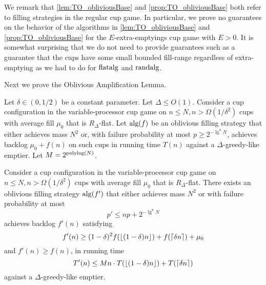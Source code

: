We remark that \cref{lem:TO_obliviousBase} and
\cref{prop:TO_obliviousBase} both refer to filling strategies in
the regular cup game. In particular, we prove no guarantees on
the behavior of the algorithms in \cref{lem:TO_obliviousBase} and
\cref{prop:TO_obliviousBase} for the $E$-extra-emptyings cup game
with $E > 0$. It is somewhat surprising that we do not need to
provide guarantees such as a guarantee that the cups have some
small bounded fill-range regardless of extra-emptying as we had
to do for $\operatorname{\text{\textup{flatalg}}}$ and $\operatorname{\text{\textup{randalg}}}$.

Next we prove the Oblivious Amplification Lemma.
\begin{lemma}
  \label{lem:TO_obliviousAmplification} 
  Let $\delta \in (0, 1/2)$ be a constant parameter. Let $\Delta
  \le O(1)$. Consider a cup configuration
  in the variable-processor cup game on $n \le N, n >
  \Omega(1/\delta^2)$ cups with average fill $\mu_0$ that is
  $R_\Delta$-flat. Let $\operatorname{\text{\textup{alg}}}(f)$ be an oblivious filling strategy
  that either achieves mass $N^2$ or, with failure probability at
  most $p\ge 2^{-\lg^8 N}$, achieves backlog $\mu_0 + f(n)$ on such cups
  in running time $T(n)$ against a $\Delta$-greedy-like emptier.
  Let $M = 2^{\operatorname{\text{polylog}}(N)}$.

  Consider a cup configuration in the variable-processor cup game
  on $n \le N, n > \Omega(1/\delta^2)$ cups with average fill
  $\mu_0$ that is $R_\Delta$-flat. There exists an oblivious
  filling strategy $\operatorname{\text{\textup{alg}}}(f')$ that either achieves mass $N^2$ or
  with failure probability at most 
  $$p' \le np + 2^{-\lg^8 N}$$
  achieves backlog $f'(n)$ satisfying 
  $$f'(n) \ge (1-\delta)^2 f(\left\lfloor (1-\delta)n \right\rfloor) + f(\left\lceil \delta n \right\rceil) + \mu_0$$ 
  and $f'(n) \ge f(n)$, in running time 
  $$T'(n) \le Mn\cdot T(\left\lfloor (1-\delta)n \right\rfloor) + T(\left\lceil \delta n \right\rceil)$$
  against a $\Delta$-greedy-like emptier.
\end{lemma}
